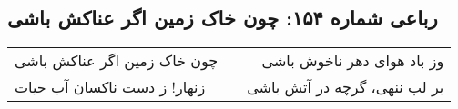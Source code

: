 \begin{center}
\section*{رباعی شماره ۱۵۴: چون خاک زمین اگر عناکش باشی}
\label{sec:154}
\begin{longtable}{l p{0.5cm} r}
چون خاک زمین اگر عناکش باشی
&&
وز باد هوای دهر ناخوش باشی
\\
زنهار! ز دست ناکسان آب حیات
&&
بر لب ننهی، گرچه در آتش باشی
\\
\end{longtable}
\end{center}
